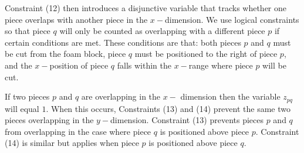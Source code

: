\documentclass[10pt,a4paper]{article}
\begin{document}
Constraint (12) then introduces a disjunctive variable that tracks whether one piece overlaps with another piece in the $x-$dimension.  We use logical constraints so that piece $q$ will only be counted as overlapping with a different piece $p$ if certain conditions are met. These conditions are that: both pieces $p$ and $q$ must be cut from the foam block, piece $q$ must be positioned to the right of piece $p$, and the $x-$position of piece $q$ falls within the $x-$range where piece $p$ will be cut. 

\begin{lpformulation}
\end{lpformulation}

If two pieces $p$ and $q$ are overlapping in the $x-$ dimension then the variable $z_{pq}$ will equal $1$. When this occurs, Constraints (13) and (14) prevent the same two pieces overlapping in the $y-$dimension. Constraint (13) prevents pieces $p$ and $q$ from overlapping in the case where piece $q$ is positioned above piece $p$. Constraint (14) is similar but applies when piece $p$ is positioned above piece $q$.


\begin{lpformulation}
\end{lpformulation}



%
%
\end{document}
